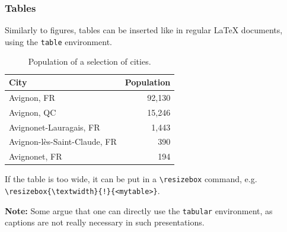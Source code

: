 \documentclass[10pt,    %
    english,            %
    xcolor=table,       %
    envcountsect,       %
    aspectratio=43      %
]{beamer}
\begin{document}
\begin{frame}
    \frametitle{Tables}

    Similarly to figures, tables can be inserted like in regular \LaTeX{} documents, using the \texttt{table} environment.

    \begin{table}[H]
        \centering
        \begin{tabular}{l r}
            \hline
	        \rowcolor{fgLightRed} 
            \textbf{City} & \textbf{Population} \\
            \hline
            Avignon, FR & 92,130 \\
            Avignon, QC & 15,246 \\
            Avignonet-Lauragais, FR & 1,443 \\
            Avignon-lès-Saint-Claude, FR & 390 \\
            Avignonet, FR & 194 \\
            \hline
        \end{tabular}
        \caption{Population of a selection of cities.}
        \label{tab:population}
    \end{table}
    
    \vspace{-0.25cm}
    If the table is too wide, it can be put in a \texttt{\textbackslash{}resizebox} command, e.g. \texttt{\textbackslash{}resizebox\{\textbackslash{}textwidth\}\{!\}\{<mytable>\}}.
    
    
    
    
    
    \vspace{0.25cm}
    \textbf{Note:} Some argue that one can directly use the \texttt{tabular} environment, as captions are not really necessary in such presentations.
\end{frame}
    
\end{document}
